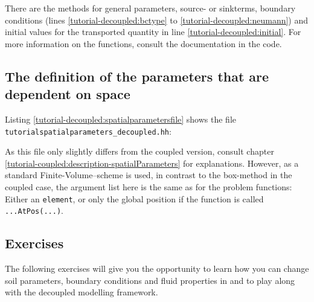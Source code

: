 There are the methods for general parameters, source- or
sinkterms, boundary conditions (lines \ref{tutorial-decoupled:bctype} to
\ref{tutorial-decoupled:neumann}) and initial values for the transported
quantity in line \ref{tutorial-decoupled:initial}. For more information
on the functions, consult the documentation in the code.

\subsection{The definition of the parameters that are dependent on space}\label{tutorial-decoupled:description-spatialParameters}

Listing \ref{tutorial-decoupled:spatialparametersfile} shows the file
\verb+tutorialspatialparameters_decoupled.hh+:

\begin{lst}\label{tutorial-decoupled:spatialparametersfile} \mbox{}

\end{lst}
As this file only slightly differs from the coupled version, consult 
chapter \ref{tutorial-coupled:description-spatialParameters} for explanations.
However, as a standard Finite-Volume--scheme is used, in contrast to the box-method
in the coupled case, the argument list here is the same as for the problem 
functions: Either an \texttt{element}, or only the global position if the function is called \texttt{...AtPos(...)}.

\subsection{Exercises}
\label{tutorial-deoucpled:exercises}
The following exercises will give you the opportunity to learn how you can change 
soil parameters, boundary conditions and fluid properties in \Dumux and to play along 
with the decoupled modelling framework.

